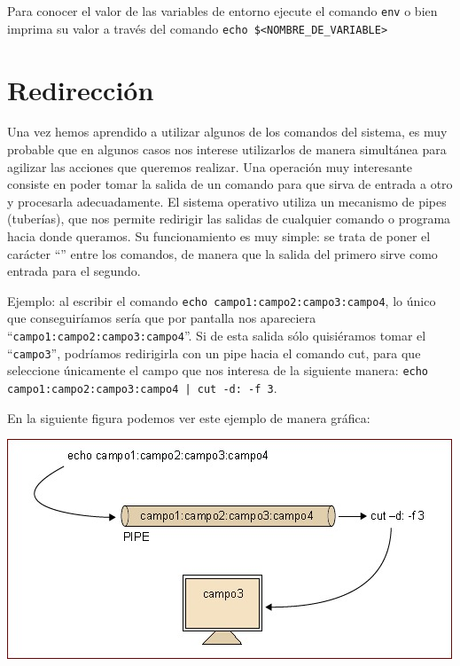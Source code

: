 \documentclass[12pt]{article}
\begin{document}
Para conocer el valor de las variables de entorno ejecute el comando \texttt{env} o bien imprima su valor
a través del comando \texttt{echo \$\textless NOMBRE\_DE\_VARIABLE\textgreater}

\section{Redirección}

Una vez hemos aprendido a utilizar algunos de los comandos del sistema, es muy probable que en 
algunos casos nos interese utilizarlos de manera simultánea para agilizar las 
acciones que queremos realizar. Una operación muy interesante consiste en poder 
tomar la salida de un comando para que sirva de entrada a otro y procesarla adecuadamente. 
El sistema operativo utiliza un mecanismo de pipes (tuberías), que nos permite redirigir las salidas 
de cualquier comando o programa hacia donde queramos. Su funcionamiento es muy simple: se trata de poner el 
carácter ``\textbar'' entre los comandos, de manera que la salida del primero sirve como
 entrada para el segundo.

Ejemplo: al escribir el comando 
\texttt{echo campo1:campo2:campo3:campo4}, lo único que conseguiríamos sería que por 
pantalla nos apareciera ``\texttt{campo1:campo2:campo3:campo4}''. Si de esta salida sólo 
quisiéramos tomar el  ``\texttt{campo3}'', podríamos redirigirla con un pipe hacia el 
comando cut, para que seleccione únicamente el campo que nos interesa de la siguiente manera: 
\texttt{echo campo1:campo2:campo3:campo4 | cut -d: -f 3}. 

En la siguiente figura podemos ver este ejemplo de manera gráfica:

\begin{center}
 \includegraphics{./img/redireccionamiento.jpg}
\end{center}
\end{document}
